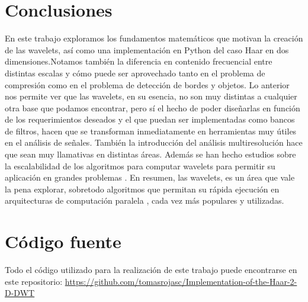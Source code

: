 \documentclass[conference]{IEEEtran}
\begin{document}
\section{Conclusiones}

En este trabajo exploramos los fundamentos matemáticos que motivan la creación de las wavelets, así como una implementación en Python del caso Haar en dos dimensiones.Notamos también la diferencia en contenido frecuencial entre distintas escalas y cómo puede ser aprovechado tanto en el problema de compresión como en el problema de detección de bordes y objetos. Lo anterior nos permite ver que las wavelets, en su esencia, no son muy distintas a cualquier otra base que podamos encontrar, pero sí el hecho de poder diseñarlas en función de los requerimientos deseados \cite{wavelettour} y el que puedan ser implementadas como bancos de filtros, hacen que se transforman inmediatamente en herramientas muy útiles en el análisis de señales. También la introducción del análisis multiresolución hace que sean muy llamativas en distintas áreas. Además se han hecho estudios sobre la escalabilidad de los algoritmos para computar wavelets para permitir su aplicación en grandes problemas \cite{esc}.
En resumen, las wavelets, es un área que vale la pena explorar, sobretodo algoritmos que permitan su rápida ejecución en arquitecturas de computación paralela \cite{paralela}, cada vez más populares y utilizadas.



\section{Código fuente}
Todo el código utilizado para la realización de este trabajo puede encontrarse en este repositorio:
\textcolor{blue}{\url{https://github.com/tomasrojasc/Implementation-of-the-Haar-2-D-DWT}}
\newline
\newline

\end{document}
